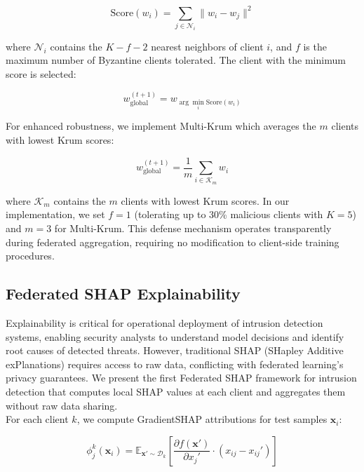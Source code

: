 \begin{equation}
	\label{equation:krum-score}
	\text{Score}(w_i) = \sum_{j \in \mathcal{N}_i} \|w_i - w_j\|^2
\end{equation}

where $\mathcal{N}_i$ contains the $K - f - 2$ nearest neighbors of client $i$, and $f$ is the maximum number of Byzantine clients tolerated. The client with the minimum score is selected:

\begin{equation}
	\label{equation:krum-selection}
	w_{\text{global}}^{(t+1)} = w_{\arg\min_i \text{Score}(w_i)}
\end{equation}

For enhanced robustness, we implement Multi-Krum which averages the $m$ clients with lowest Krum scores:

\begin{equation}
	\label{equation:multi-krum}
	w_{\text{global}}^{(t+1)} = \frac{1}{m} \sum_{i \in \mathcal{K}_m} w_i
\end{equation}

where $\mathcal{K}_m$ contains the $m$ clients with lowest Krum scores. In our implementation, we set $f = 1$ (tolerating up to 30\% malicious clients with $K=5$) and $m = 3$ for Multi-Krum. This defense mechanism operates transparently during federated aggregation, requiring no modification to client-side training procedures.

\subsection{Federated SHAP Explainability}
\label{subsection:federated-shap}
Explainability is critical for operational deployment of intrusion detection systems, enabling security analysts to understand model decisions and identify root causes of detected threats. However, traditional SHAP (SHapley Additive exPlanations) requires access to raw data, conflicting with federated learning's privacy guarantees. We present the first Federated SHAP framework for intrusion detection that computes local SHAP values at each client and aggregates them without raw data sharing. \\

For each client $k$, we compute GradientSHAP attributions for test samples $\mathbf{x}_i$:

\begin{equation}
	\label{equation:gradient-shap}
	\phi_j^k(\mathbf{x}_i) = \mathbb{E}_{\mathbf{x}' \sim \mathcal{D}_k}\left[\frac{\partial f(\mathbf{x}')}{\partial x_j'} \cdot (x_{ij} - x_{ij}')\right]
\end{equation}

